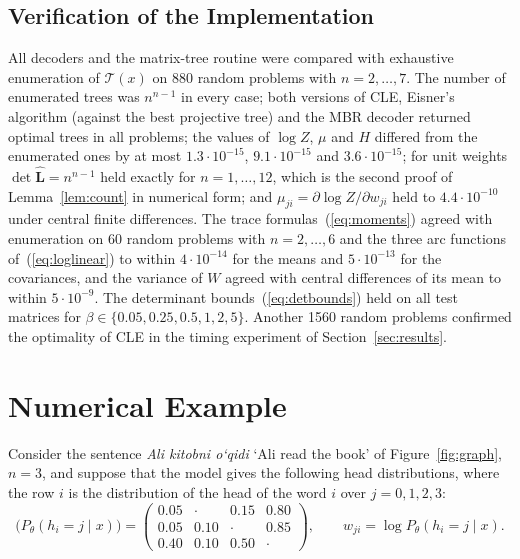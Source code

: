 \documentclass[mathematics,article,submit,pdftex,oneauthor]{Definitions/mdpi}
\newcommand{\T}{\mathcal T}
\newcommand{\Lh}{\hat{\mathbf L}}
\begin{document}
\subsection{Verification of the Implementation}\label{sec:verification}
All decoders and the matrix-tree routine were compared with exhaustive enumeration of $\T(x)$ on 880 random problems with $n=2,\dots,7$.
The number of enumerated trees was $n^{n-1}$ in every case; both versions of CLE, Eisner's algorithm (against the best projective tree) and the MBR decoder returned optimal trees in all problems; the values of $\log Z$, $\mu$ and $H$ differed from the enumerated ones by at most $1.3\cdot10^{-15}$, $9.1\cdot10^{-15}$ and $3.6\cdot10^{-15}$; for unit weights $\det\Lh=n^{n-1}$ held exactly for $n=1,\dots,12$, which is the second proof of Lemma~\ref{lem:count} in numerical form; and $\mu_{ji}=\partial\log Z/\partial w_{ji}$ held to $4.4\cdot10^{-10}$ under central finite differences.
The trace formulas~(\ref{eq:moments}) agreed with enumeration on 60 random problems with $n=2,\dots,6$ and the three arc functions of~(\ref{eq:loglinear}) to within $4\cdot10^{-14}$ for the means and $5\cdot10^{-13}$ for the covariances, and the variance of $W$ agreed with central differences of its mean to within $5\cdot10^{-9}$.
The determinant bounds~(\ref{eq:detbounds}) held on all test matrices for $\beta\in\{0.05,0.25,0.5,1,2,5\}$.
Another 1560 random problems confirmed the optimality of CLE in the timing experiment of Section~\ref{sec:results}.

\section{Numerical Example}\label{sec:example}

Consider the sentence \textit{Ali kitobni o\textquoteleft qidi} `Ali read the book' of Figure~\ref{fig:graph}, $n=3$, and suppose that the model gives the following head distributions, where the row $i$ is the distribution of the head of the word $i$ over $j=0,1,2,3$:
\begin{equation}\label{eq:example}
\bigl(P_\theta(h_i=j\mid x)\bigr)=
\begin{pmatrix}
0.05 & \cdot & 0.15 & 0.80\\
0.05 & 0.10 & \cdot & 0.85\\
0.40 & 0.10 & 0.50 & \cdot
\end{pmatrix},\qquad w_{ji}=\log P_\theta(h_i=j\mid x).
\end{equation}
\end{document}
